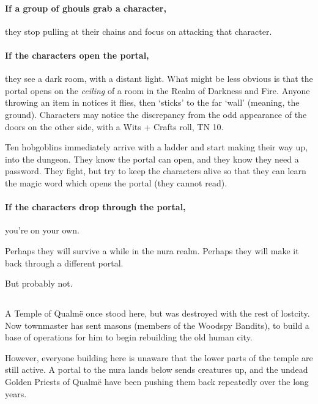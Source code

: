 \begin{multicols}{2}
\paragraph{If a group of ghouls grab a character,}
they stop pulling at their chains and focus on attacking that character.

\paragraph{If the characters open the portal,}
they see a dark room, with a distant light.
What might be less obvious is that the portal opens on the \emph{ceiling} of a room in the Realm of Darkness and Fire.
Anyone throwing an item in notices it flies, then `sticks' to the far `wall' (meaning, the ground).
Characters may notice the discrepancy from the odd appearance of the doors on the other side, with a Wits + Crafts roll, TN 10.

Ten hobgoblins immediately arrive with a ladder and start making their way up, into the dungeon.
They know the portal can open, and they know they need a password.
They fight, but try to keep the characters alive so that they can learn the magic word which opens the portal (they cannot read).

\paragraph{If the characters drop through the portal,}
you're on your own.

Perhaps they will survive a while in the nura realm.
Perhaps they will make it back through a different portal.

But probably not.

\subsection{}
\label{green_tower}
\setcounter{list}{0}


A Temple of Qualm\"{e} once stood here, but was destroyed with the rest of \gls{lostcity}.
Now \gls{townmaster} has sent masons (members of the Woodspy Bandits), to build a base of operations for him to begin rebuilding the old human city.

However, everyone building here is unaware that the lower parts of the temple are still active.
A portal to the nura lands below sends creatures up, and the undead Golden Priests of Qualm\"{e} have been pushing them back repeatedly over the long years.


\end{multicols}
